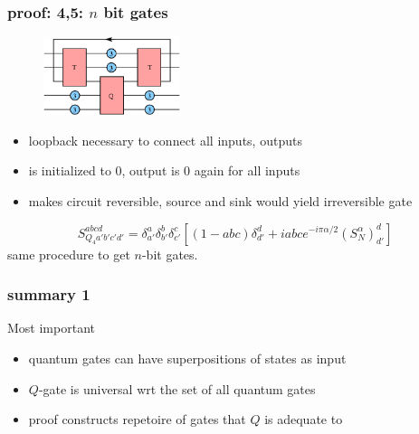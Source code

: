 \documentclass{beamer}
\begin{document}
\begin{frame}
	\frametitle{proof: 4,5: $n$ bit gates}
	\begin{figure}
		\centering
		\includegraphics[width=4cm]{fig/four_bit.png}
	\end{figure}
	\begin{itemize}
		\item loopback necessary to connect all inputs, outputs
		\item is initialized to $0$, output is $0$ again for all inputs
		\item makes circuit reversible, source and sink would yield irreversible gate
	\end{itemize}
	\begin{equation*}
     S_{Q_4a'b'c'd'}^{abcd}=\delta_{a'}^{a}\delta_{b'}^b\delta_{c'}^c[(1-abc)\delta_{d'}^d+iabc e^{-i\pi\alpha/2}(S_N^\alpha)_{d'}^d]
    \end{equation*}
    same procedure to get $n$-bit gates.\\
\end{frame}
%
\begin{frame}
	\frametitle{summary 1}
    \begin{block}{Most important}
        \begin{itemize}
			\item quantum gates can have superpositions of states as input
			\item $Q$-gate is universal wrt the set of all quantum gates
			\item proof constructs repetoire of gates that $Q$ is adequate to
		\end{itemize}
    \end{block}
\end{frame}
%
%
\end{document}
